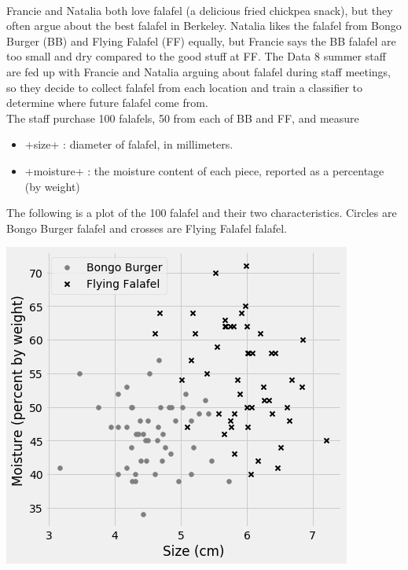 \\[10pt]
Francie and Natalia both love falafel (a delicious fried chickpea snack), but they often argue about the best falafel in Berkeley. Natalia likes the falafel from Bongo Burger (BB)  and Flying Falafel (FF) equally, but Francie says the BB falafel are too small and dry compared to the good stuff at FF. The Data 8 summer staff are fed up with Francie and Natalia arguing about falafel during staff meetings, so they decide to collect falafel from each location and train a classifier to determine where future falafel come from. \\
The staff purchase 100 falafels, 50 from each of BB and FF, and measure
\begin{itemize}
    \item \lsi+size+ : diameter of falafel, in millimeters.
    \item \lsi+moisture+ : the moisture content of each piece, reported as a percentage (by weight)
\end{itemize}
The following is a plot of the 100 falafel and their two characteristics. Circles are Bongo Burger falafel and crosses are Flying Falafel falafel. 
\begin{center}
    \includegraphics[scale=.6]{figures/falafel.png}
\end{center}

